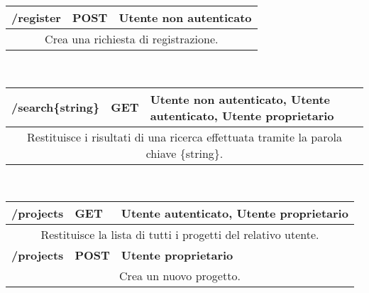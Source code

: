 \begin{table}[h]
	\begin{tabular}{|p{}|p{}|p{}|}
		\toprule
		\textbf{/register} & \textbf{POST} & \textbf{Utente non autenticato} \\ \midrule
		\multicolumn{3}{|c|}{Crea una richiesta di registrazione.} \\
		\bottomrule
	\end{tabular}\\
	\par\bigskip
	
	\begin{tabular}{|p{}|p{}|p{}|}
		\toprule
		\textbf{/search\{string\}} & \textbf{GET} & \textbf{Utente non autenticato, Utente autenticato, Utente proprietario} \\ \midrule
		\multicolumn{3}{|c|}{Restituisce i risultati di una ricerca effettuata tramite la parola chiave \{string\}.} \\
		\bottomrule
	\end{tabular}\\
	\par\bigskip
	
	\begin{tabular}{|p{}|p{}|p{}|}
		\toprule
		\textbf{/projects} & \textbf{GET} & \textbf{Utente autenticato, Utente proprietario} \\ \midrule
		\multicolumn{3}{|c|}{Restituisce la lista di tutti i progetti del relativo utente.} \\
		\bottomrule
		\textbf{/projects} & \textbf{POST} & \textbf{Utente proprietario} \\ \midrule
		\multicolumn{3}{|c|}{Crea un nuovo progetto.} \\
		\bottomrule
	\end{tabular}
\end{table}
\newpage

